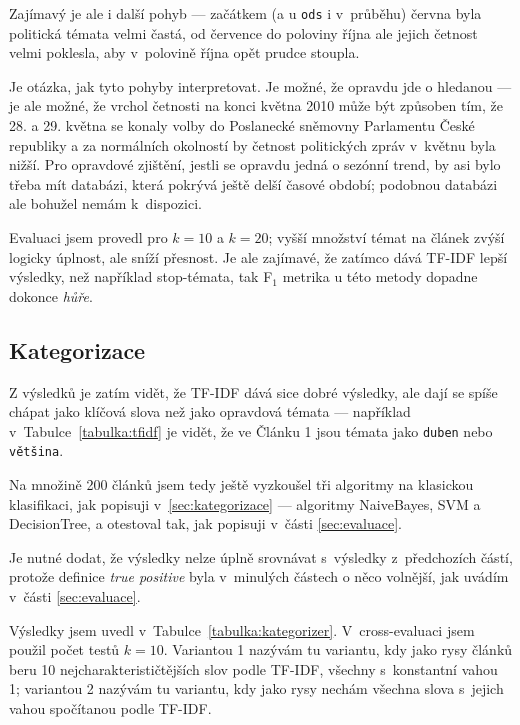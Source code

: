 \documentclass[12pt,a4paper]{report}
\begin{document}
Zajímavý je ale i další pohyb --- začátkem (a u \texttt{ods} i v~průběhu) června byla politická témata velmi častá, od července do poloviny října ale jejich četnost velmi poklesla, aby v~polovině října opět prudce stoupla.

Je otázka, jak tyto pohyby interpretovat. Je možné, že opravdu jde o hledanou  --- je ale možné, že vrchol četnosti na konci května 2010 může být způsoben tím, že 28. a 29. května se konaly volby do Poslanecké sněmovny Parlamentu České republiky a za normálních okolností by četnost politických zpráv v~květnu byla nižší. Pro opravdové zjištění, jestli se opravdu jedná o sezónní trend, by asi bylo třeba mít databázi, která pokrývá ještě delší časové období; podobnou databázi ale bohužel nemám k~dispozici.




Evaluaci jsem provedl pro $k=10$ a $k=20$; vyšší množství témat na článek zvýší logicky úplnost, ale sníží přesnost. Je ale zajímavé, že zatímco  dává TF-IDF lepší výsledky, než například stop-témata, tak F$_1$ metrika u této metody dopadne dokonce \emph{hůře}.

\subsection{Kategorizace}
Z výsledků je zatím vidět, že TF-IDF dává sice dobré výsledky, ale dají se spíše chápat jako klíčová slova než jako opravdová témata --- například v~Tabulce~\ref{tabulka:tfidf} je vidět, že ve Článku 1 jsou témata jako \texttt{duben} nebo \texttt{většina}.


Na množině 200 článků jsem tedy ještě vyzkoušel tři algoritmy na klasickou klasifikaci, jak popisuji v~\ref{sec:kategorizace} --- algoritmy NaiveBayes, SVM a DecisionTree, a otestoval tak, jak popisuji v~části \ref{sec:evaluace}. 

Je nutné dodat, že výsledky nelze úplně srovnávat s~výsledky z~předchozích částí, protože definice \emph{true positive} byla v~minulých částech o něco volnější, jak uvádím v~části \ref{sec:evaluace}.

\label{sec:neomezene}


Výsledky jsem uvedl v~Tabulce~\ref{tabulka:kategorizer}. V~cross-evaluaci jsem použil počet testů $k=10$. Variantou 1 nazývám tu variantu, kdy jako rysy článků beru 10 nej\-cha\-rak\-te\-ri\-sti\-čtěj\-ších slov podle TF-IDF, všechny s~konstantní vahou 1; variantou 2 nazývám tu variantu, kdy jako rysy nechám všechna slova s~jejich vahou spočítanou podle TF-IDF.
\end{document}
